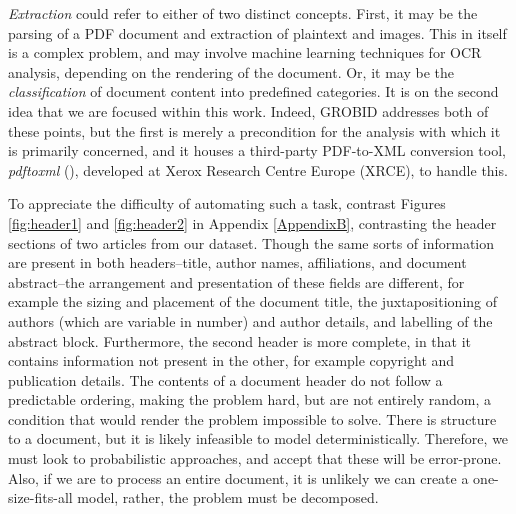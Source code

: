 \emph{Extraction} could refer to either of two distinct concepts. First, it may be the parsing of a PDF document and extraction of plaintext and images. This in itself is a complex problem, and may involve machine learning techniques for OCR analysis, depending on the rendering of the document. Or, it may be the \emph{classification} of document content into predefined categories. It is on the second idea that we are focused within this work. Indeed, GROBID addresses both of these points, but the first is merely a precondition for the analysis with which it is primarily concerned, and it houses a third-party PDF-to-XML conversion tool, \emph{pdftoxml} (\cite{dejean2006system}), developed at Xerox Research Centre Europe (XRCE), to handle this.

To appreciate the difficulty of automating such a task, contrast Figures \ref{fig:header1} and \ref{fig:header2} in Appendix \ref{AppendixB}, contrasting the header sections of two articles from our dataset. Though the same sorts of information are present in both headers--title, author names, affiliations, and document abstract--the arrangement and presentation of these fields are different, for example the sizing and placement of the document title, the juxtapositioning of authors (which are variable in number) and author details, and labelling of the abstract block. Furthermore, the second header is more complete, in that it contains information not present in the other, for example copyright and publication details. The contents of a document header do not follow a predictable ordering, making the problem hard, but are not entirely random, a condition that would render the problem impossible to solve. There is structure to a document, but it is likely infeasible to model deterministically. Therefore, we must look to probabilistic approaches, and accept that these will be error-prone. Also, if we are to process an entire document, it is unlikely we can create a one-size-fits-all model, rather, the problem must be decomposed.

